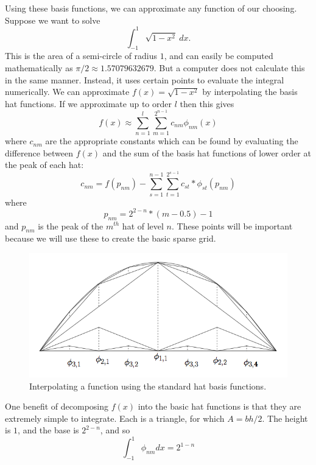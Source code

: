 Using these basis functions, we can approximate any function of our choosing.  Suppose we want to solve
\begin{equation*}
\int_{-1}^{1} \sqrt{1-x^2}\: dx .
\end{equation*}
This is the area of a semi-circle of radius $1$, and can easily be computed mathematically as $\pi / 2 \approx 1.57079632679$.  But a computer does not calculate this in the same manner.  Instead, it uses certain points to evaluate the integral numerically.  We can approximate $f(x) = \sqrt{1-x^2}$ by interpolating the basis hat functions.  If we approximate up to order $l$ then this gives
\begin{equation*}
f(x) \approx \sum_{n=1}^l \sum_{m=1}^{2^{n-1}} c_{nm} \phi_{nm}(x) 
\end{equation*}
where $c_{nm}$ are the appropriate constants which can be found by evaluating the difference between $f(x)$ and the sum of the basis hat functions of lower order at the peak of each hat:
\begin{equation}
c_{nm} = f(p_{nm}) - \sum_{s=1}^{n-1} \sum_{t=1}^{2^{s-1}} c_{st}*\phi_{st}(p_{nm})
\end{equation}
where
\begin{equation}
p_{nm}=2^{2-n}*(m-0.5)-1
\label{eq:points}
\end{equation}
and $p_{nm}$ is the peak of the $m^{th}$ hat of level $n$.  These points will be important because we will use these to create the basic sparse grid.

\begin{center}
\begin{figure}
\includegraphics[width=.7\textwidth]{HB.png}
\caption{Interpolating a function using the standard hat basis functions.}
\label{fig:HB}
\end{figure}
\end{center}

One benefit of decomposing $f(x)$ into the basic hat functions is that they are extremely simple to integrate.  Each is a triangle, for which $A=bh/2$.  The height is $1$, and the base is $2^{2-n}$, and so
\begin{equation*}
\int_{-1}^1 \phi_{nm} dx= 2^{1-n}
\end{equation*}

